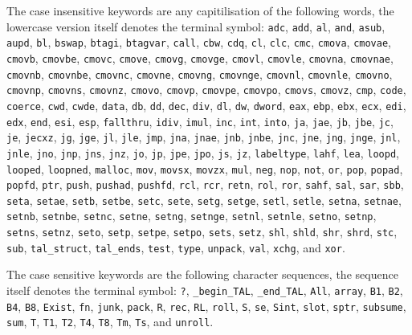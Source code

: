 \documentclass{article}
\newcommand{\ts}[1]{\hbox{\tt#1}}
\begin{document}
The case insensitive keywords are any capitilisation of the following
words, the lowercase version itself denotes the terminal symbol:
\ts{adc}, \ts{add}, \ts{al}, \ts{and}, \ts{asub}, \ts{aupd},
\ts{bl}, \ts{bswap}, \ts{btagi}, \ts{btagvar}, \ts{call},
\ts{cbw}, \ts{cdq}, \ts{cl}, \ts{clc}, \ts{cmc}, \ts{cmova},
\ts{cmovae}, \ts{cmovb}, \ts{cmovbe}, \ts{cmovc}, \ts{cmove},
\ts{cmovg}, \ts{cmovge}, \ts{cmovl}, \ts{cmovle}, \ts{cmovna},
\ts{cmovnae}, \ts{cmovnb}, \ts{cmovnbe}, \ts{cmovnc}, \ts{cmovne},
\ts{cmovng}, \ts{cmovnge}, \ts{cmovnl}, \ts{cmovnle}, \ts{cmovno},
\ts{cmovnp}, \ts{cmovns}, \ts{cmovnz}, \ts{cmovo}, \ts{cmovp},
\ts{cmovpe}, \ts{cmovpo}, \ts{cmovs}, \ts{cmovz}, \ts{cmp}, \ts{code},
\ts{coerce}, \ts{cwd}, \ts{cwde}, \ts{data}, \ts{db}, \ts{dd},
\ts{dec}, \ts{div}, \ts{dl}, \ts{dw}, \ts{dword}, \ts{eax}, \ts{ebp},
\ts{ebx}, \ts{ecx}, \ts{edi}, \ts{edx}, \ts{end}, \ts{esi}, \ts{esp},
\ts{fallthru}, \ts{idiv}, \ts{imul}, \ts{inc}, \ts{int}, \ts{into},
\ts{ja}, \ts{jae}, \ts{jb}, \ts{jbe}, \ts{jc}, \ts{je}, \ts{jecxz},
\ts{jg}, \ts{jge}, \ts{jl}, \ts{jle}, \ts{jmp}, \ts{jna}, \ts{jnae},
\ts{jnb}, \ts{jnbe}, \ts{jnc}, \ts{jne}, \ts{jng}, \ts{jnge},
\ts{jnl}, \ts{jnle}, \ts{jno}, \ts{jnp}, \ts{jns}, \ts{jnz}, \ts{jo},
\ts{jp}, \ts{jpe}, \ts{jpo}, \ts{js}, \ts{jz}, \ts{labeltype},
\ts{lahf}, \ts{lea}, \ts{loopd}, \ts{looped}, \ts{loopned},
\ts{malloc}, \ts{mov}, \ts{movsx}, \ts{movzx}, \ts{mul}, \ts{neg},
\ts{nop}, \ts{not}, \ts{or}, \ts{pop}, \ts{popad}, \ts{popfd},
\ts{ptr}, \ts{push}, \ts{pushad}, \ts{pushfd}, \ts{rcl}, \ts{rcr},
\ts{retn}, \ts{rol}, \ts{ror}, \ts{sahf}, \ts{sal}, \ts{sar},
\ts{sbb}, \ts{seta}, \ts{setae}, \ts{setb}, \ts{setbe}, \ts{setc},
\ts{sete}, \ts{setg}, \ts{setge}, \ts{setl}, \ts{setle}, \ts{setna},
\ts{setnae}, \ts{setnb}, \ts{setnbe}, \ts{setnc}, \ts{setne},
\ts{setng}, \ts{setnge}, \ts{setnl}, \ts{setnle}, \ts{setno},
\ts{setnp}, \ts{setns}, \ts{setnz}, \ts{seto}, \ts{setp}, \ts{setpe},
\ts{setpo}, \ts{sets}, \ts{setz}, \ts{shl}, \ts{shld}, \ts{shr},
\ts{shrd}, \ts{stc}, \ts{sub}, \ts{tal\_struct}, \ts{tal\_ends},
\ts{test}, \ts{type}, \ts{unpack}, \ts{val}, \ts{xchg}, and \ts{xor}.

The case sensitive keywords are the following character sequences, the sequence
itself denotes the terminal symbol: \ts{?}, \ts{\_begin\_TAL}, \ts{\_end\_TAL},
\ts{All}, \ts{array}, \ts{B1}, \ts{B2}, \ts{B4}, \ts{B8},
\ts{Exist}, \ts{fn}, \ts{junk},
\ts{pack}, \ts{R}, \ts{rec}, \ts{RL}, \ts{roll}, \ts{S},
\ts{se}, \ts{Sint}, \ts{slot}, \ts{sptr}, \ts{subsume}, \ts{sum}, \ts{T},
\ts{T1}, \ts{T2}, \ts{T4}, \ts{T8}, \ts{Tm}, \ts{Ts}, and \ts{unroll}.
\end{document}
